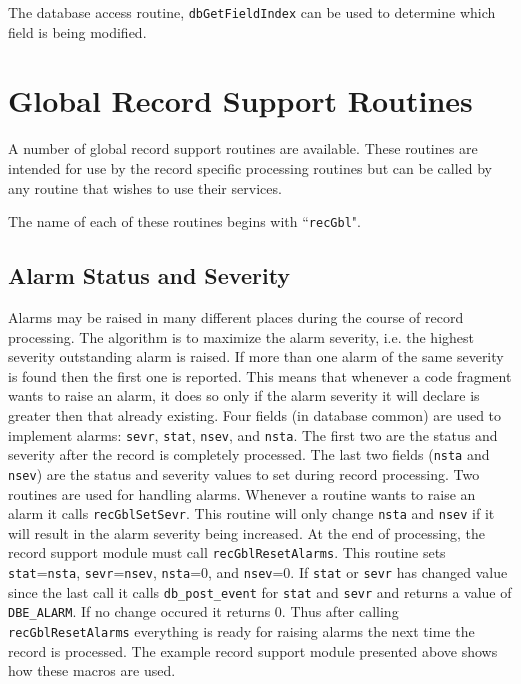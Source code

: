 The database access routine, \verb|dbGetFieldIndex| can be used to determine which field is being modified.

\section{Global Record Support Routines}

A number of global record support routines are available. These routines are intended for use by the record specific 
processing routines but can be called by any routine that wishes to use their services.

The name of each of these routines begins with ``\verb|recGbl|".

\subsection{Alarm Status and Severity}

Alarms may be raised in many different places during the course of record processing. The algorithm is to maximize the 
alarm severity, i.e. the highest severity outstanding alarm is raised. If more than one alarm of the same severity is found 
then the first one is reported. This means that whenever a code fragment wants to raise an alarm, it does so only if the 
alarm severity it will declare is greater then that already existing. Four fields (in database common) are used to implement 
alarms: \verb|sevr|, \verb|stat|, \verb|nsev|, and \verb|nsta|. The first two are the status and severity after the record is completely processed. 
The last two fields (\verb|nsta| and \verb|nsev|) are the status and severity values to set during record processing. Two routines are 
used for handling alarms. Whenever a routine wants to raise an alarm it calls \verb|recGblSetSevr|. This routine will only 
change \verb|nsta| and \verb|nsev| if it will result in the alarm severity being increased. At the end of processing, the record support 
module must call \verb|recGblResetAlarms|. This routine sets \verb|stat|=\verb|nsta|, \verb|sevr|=\verb|nsev|, \verb|nsta|=0, and \verb|nsev|=0. If \verb|stat| 
or \verb|sevr| has changed value since the last call it calls \verb|db_post_event| for \verb|stat| and \verb|sevr| and returns a value of 
\verb|DBE_ALARM|. If no change occured it returns 0. Thus after calling \verb|recGblResetAlarms| everything is ready for raising 
alarms the next time the record is processed. The example record support module presented above shows how these 
macros are used.

